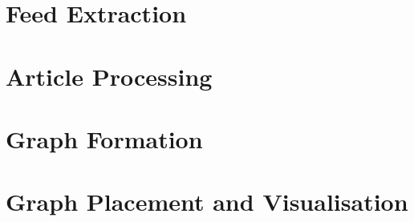\section{Feed Extraction}

\section{Article Processing}

\section{Graph Formation}

\section{Graph Placement and Visualisation}